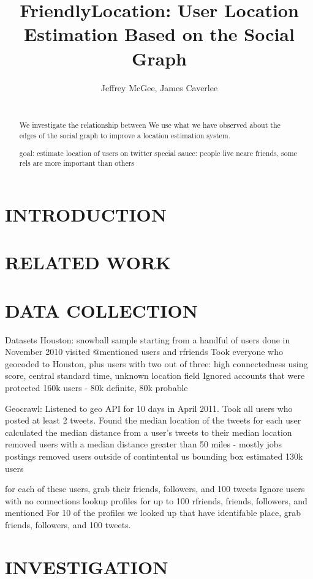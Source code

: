 \documentclass{sig-alternate}
\title{FriendlyLocation: User Location Estimation Based on the Social Graph}
\author{
    \alignauthor Jeffrey McGee, James Caverlee
    \affaddr{Department of Computer Science and Engineering, Texas A\&M
    University} \\
    \affaddr{ College Station, TX 77845 USA} \\
    \email{jeffamcgee@tamu.edu, caverlee@cse.tamu.edu}
}
\begin{document}
\maketitle
\begin{abstract}
We investigate the relationship between 
We use what we have observed about the edges of the social graph to improve a location estimation system.

goal: estimate location of users on twitter
special sauce: people live neare friends, some rels are more important than others
\end{abstract}




\section{INTRODUCTION}
\section{RELATED WORK}
\section{DATA COLLECTION}

Datasets
Houston:
snowball sample starting from a handful of users done in November 2010
visited @mentioned users and rfriends
Took everyone who geocoded to Houston, plus users with two out of three:
    high connectedness using score,
    central standard time,
    unknown location field
Ignored accounts that were protected
160k users - 80k definite, 80k probable


Geocrawl:
Listened to geo API for 10 days in April 2011.
Took all users who posted at least 2 tweets.
Found the median location of the tweets for each user
calculated the median distance from a user's tweets to their median location
removed users with a median distance greater than 50 miles - mostly jobs postings
removed users outside of contintental us bounding box
estimated 130k users

for each of these users, grab their friends, followers, and 100 tweets
Ignore users with no connections
lookup profiles for up to 100 rfriends, friends, followers, and mentioned
For 10 of the profiles we looked up that have identifable place, grab friends, followers, and 100 tweets.

\section{INVESTIGATION}
\end{document}
